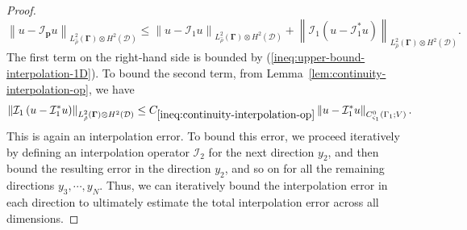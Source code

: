 \documentclass[final,onefignum,onetabnum]{mousaviart}
\begin{document}
\begin{proof}
				\begin{equation*}
					\label{ineq:error-interpolation-triangle}
					\left\| u - \mathcal{I}_{\boldsymbol{p}} u \right\|_{L_{\hat{\rho}}^2(\boldsymbol{\Gamma}) \otimes H^2(\mathcal{D})}
					\leq
					\left\| u - \mathcal{I}_1u \right\|_{L_{\hat{\rho}}^2(\boldsymbol{\Gamma}) \otimes H^2(\mathcal{D})}
					+ 
					\left\| \mathcal{I}_1 \left( u - \mathcal{I}_1^* u \right) 
					\right\|_{L_{\hat{\rho}}^2(\boldsymbol{\Gamma}) \otimes H^2(\mathcal{D})} .
				\end{equation*}
				The first term on the right-hand side is bounded by (\ref{ineq:upper-bound-interpolation-1D}). To bound the second term, from Lemma~\ref{lem:continuity-interpolation-op}, we have
				\begin{equation*}
					\label{ineq:continuity-interpolation1}
					\left\| \mathcal{I}_1 \left( u - \mathcal{I}_1^* u \right) 
					\right\|_{L_{\hat{\rho}}^2(\boldsymbol{\Gamma}) \otimes H^2(\mathcal{D})}
					\leq
					C_{\ref{ineq:continuity-interpolation-op}}
					\left\|  u - \mathcal{I}_1^* u \right\|_{C_{\varsigma_1}^0(\Gamma_1; V)}.
				\end{equation*}
				This is again an interpolation error. To bound this error, we proceed iteratively by defining an interpolation operator $\mathcal{I}_2$ for the next direction $y_2$, and then bound the resulting error in the direction $y_2$, and so on for all the remaining directions $y_3, \cdots, y_N$. Thus, we can iteratively bound the interpolation error in each direction to ultimately estimate the total interpolation error across all dimensions.

\end{proof}
\end{document}
